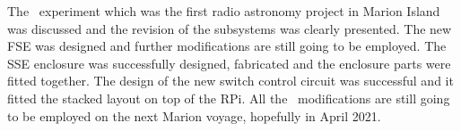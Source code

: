 The \prizm\ experiment which was the first radio astronomy project in Marion Island was discussed and the revision of the subsystems was clearly presented. The new FSE was designed and further modifications are still going to be employed. The SSE enclosure was successfully designed, fabricated and the enclosure parts were fitted together. The design of the new switch control circuit was successful and it fitted the stacked layout on top of the RPi. All the \prizm\ modifications are still going to be employed on the next Marion voyage, hopefully in April 2021. 